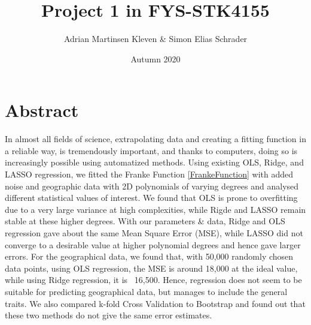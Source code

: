 \documentclass[11pt,a4paper,titlepage]{article}
\title{Project 1 in FYS-STK4155}
\author{Adrian Martinsen Kleven & Simon Elias Schrader }
\date{Autumn 2020}
\begin{document}
\tableofcontents
\listoffigures
\listoftables

\clearpage
\section{Abstract}
In almost all fields of science, extrapolating data and creating a fitting function in a reliable way, is tremendously important, and thanks to computers, doing so is increasingly possible using automatized methods. Using existing OLS, Ridge, and LASSO regression, we fitted the Franke Function \eqref{FrankeFunction} with added noise and geographic data with 2D polynomials of varying degrees and analysed different statistical values of interest. We found that OLS is prone to overfitting due to a very large variance at high complexities, while Rigde and LASSO remain stable at these higher degrees. With our parameters \& data, Ridge and OLS regression gave about the same Mean Square Error (MSE), while LASSO did not converge to a desirable value at higher polynomial degrees and hence gave larger errors. For the geographical data, we found that, with 50,000 randomly chosen data points, using  OLS regression, the MSE is around 18,000 at the ideal value, while using Ridge regression, it is ~16,500. Hence, regression does not seem to be suitable for predicting geographical data, but manages to include the general traits. We also compared k-fold Cross Validation to Bootstrap and found out that these two methods do not give the same error estimates. 

\end{document}

